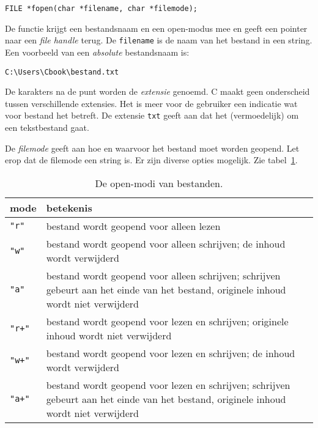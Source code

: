 \begin{lstlisting}[style=lstoneline]
FILE *fopen(char *filename, char *filemode);
\end{lstlisting}

De functie krijgt een bestandsnaam en een open-modus mee en geeft een pointer naar een \textsl{file handle} terug.
De \texttt{filename} is de naam van het bestand in een string. Een voorbeeld van een \textsl{absolute} bestandsnaam is:

\begin{lstlisting}[style=lstoneline]
C:\Users\Cbook\bestand.txt
\end{lstlisting}

De karakters na de punt worden de \textsl{extensie} genoemd. C maakt geen onderscheid tussen verschillende extensies. Het is meer voor de gebruiker een indicatie wat voor bestand het betreft. De extensie \texttt{txt} geeft aan dat het (vermoedelijk) om een tekstbestand gaat.

De \textsl{filemode} geeft aan hoe en waarvoor het bestand moet worden geopend. Let erop dat de filemode een string is. Er zijn diverse opties mogelijk. Zie tabel~\ref{tab:invopenmodes}.

\begin{table}[!ht]
\centering
\caption{De open-modi van bestanden.}
\label{tab:invopenmodes}
\begin{tabular}{lp{13cm}}
mode & betekenis \\
\midrule
\texttt{"r"} & bestand wordt geopend voor alleen lezen \\
\texttt{"w"} & bestand wordt geopend voor alleen schrijven; de inhoud wordt verwijderd \\
\texttt{"{}a"} & bestand wordt geopend voor alleen schrijven; schrijven gebeurt aan het einde van het bestand, originele inhoud wordt niet verwijderd \\
\texttt{"r+"} & bestand wordt geopend voor lezen en schrijven; originele inhoud wordt niet verwijderd\\
\texttt{"w+"} & bestand wordt geopend voor lezen en schrijven; de inhoud wordt verwijderd \\
\texttt{"{}a+"} & bestand wordt geopend voor lezen en schrijven; schrijven gebeurt aan het einde van het bestand, originele inhoud wordt niet verwijderd \\
\bottomrule
\end{tabular}
\end{table}

